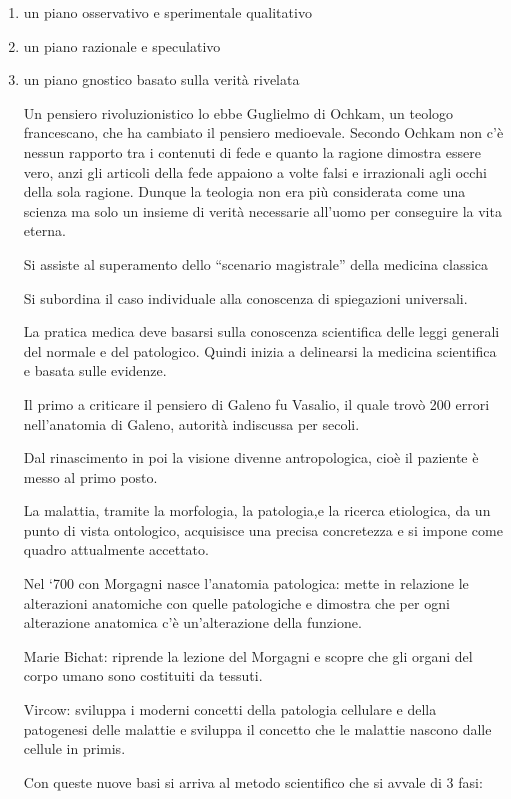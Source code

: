 \documentclass[]{article}
\begin{document}
\begin{enumerate}
\def\labelenumi{\arabic{enumi}.}
\item
  un piano osservativo e sperimentale qualitativo
\item
  un piano razionale e speculativo
\item
  un piano gnostico basato sulla verità rivelata

  Un pensiero rivoluzionistico lo ebbe Guglielmo di Ochkam, un teologo
  francescano, che ha cambiato il pensiero medioevale. Secondo Ochkam
  non c'è nessun rapporto tra i contenuti di fede e quanto la ragione
  dimostra essere vero, anzi gli articoli della fede appaiono a volte
  falsi e irrazionali agli occhi della sola ragione. Dunque la teologia
  non era più considerata come una scienza ma solo un insieme di verità
  necessarie all'uomo per conseguire la vita eterna.

  Si assiste al superamento dello ``scenario magistrale'' della medicina
  classica

  Si subordina il caso individuale alla conoscenza di spiegazioni
  universali.

  La pratica medica deve basarsi sulla conoscenza scientifica delle
  leggi generali del normale e del patologico. Quindi inizia a
  delinearsi la medicina scientifica e basata sulle evidenze.

  Il primo a criticare il pensiero di Galeno fu Vasalio, il quale trovò
  200 errori nell'anatomia di Galeno, autorità indiscussa per secoli.

  Dal rinascimento in poi la visione divenne antropologica, cioè il
  paziente è messo al primo posto.

  La malattia, tramite la morfologia, la patologia,e la ricerca
  etiologica, da un punto di vista ontologico, acquisisce una precisa
  concretezza e si impone come quadro attualmente accettato.

  Nel `700 con Morgagni nasce l'anatomia patologica: mette in relazione
  le alterazioni anatomiche con quelle patologiche e dimostra che per
  ogni alterazione anatomica c'è un'alterazione della funzione.

  Marie Bichat: riprende la lezione del Morgagni e scopre che gli organi
  del corpo umano sono costituiti da tessuti.

  Vircow: sviluppa i moderni concetti della patologia cellulare e della
  patogenesi delle malattie e sviluppa il concetto che le malattie
  nascono dalle cellule in primis.

  Con queste nuove basi si arriva al metodo scientifico che si avvale di
  3 fasi:


\end{enumerate}
\end{document}
